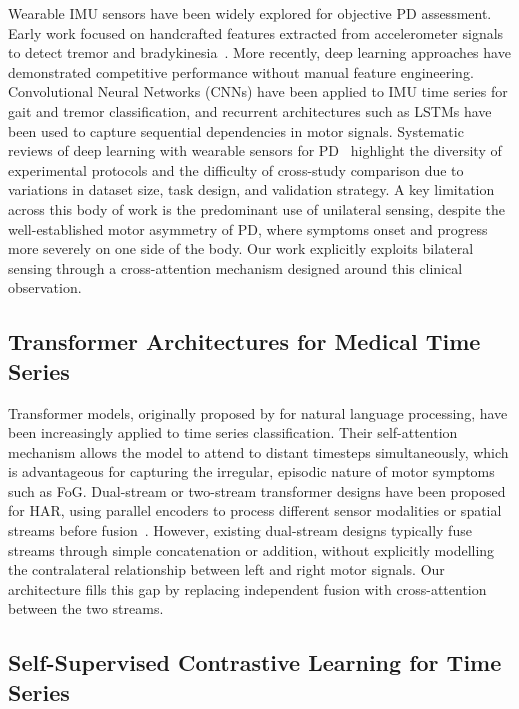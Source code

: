 \documentclass[pmlr]{jmlr}
\begin{document}
Wearable IMU sensors have been widely explored for objective PD
assessment. Early work focused on handcrafted features extracted from
accelerometer signals to detect tremor and bradykinesia~\citep{ref}.
More recently, deep learning approaches have demonstrated competitive
performance without manual feature engineering. Convolutional Neural
Networks (CNNs) have been applied to IMU time series for gait and
tremor classification, and recurrent architectures such as LSTMs have
been used to capture sequential dependencies in motor signals.
Systematic reviews of deep learning with wearable sensors for
PD~\citep{ref} highlight the diversity of experimental protocols and
the difficulty of cross-study comparison due to variations in dataset
size, task design, and validation strategy. A key limitation across
this body of work is the predominant use of unilateral sensing,
despite the well-established motor asymmetry of PD, where symptoms
onset and progress more severely on one side of the body. Our work
explicitly exploits bilateral sensing through a cross-attention
mechanism designed around this clinical observation.

\subsection{Transformer Architectures for Medical Time Series}

Transformer models, originally proposed by \citet{vaswani2017} for
natural language processing, have been increasingly applied to time
series classification. Their self-attention mechanism allows the model
to attend to distant timesteps simultaneously, which is advantageous
for capturing the irregular, episodic nature of motor symptoms such as
FoG. Dual-stream or two-stream transformer designs have been proposed
for HAR, using parallel encoders to process different sensor
modalities or spatial streams before fusion~\citep{ref}. However,
existing dual-stream designs typically fuse streams through simple
concatenation or addition, without explicitly modelling the
contralateral relationship between left and right motor signals. Our
architecture fills this gap by replacing independent fusion with
cross-attention between the two streams.

\subsection{Self-Supervised Contrastive Learning for Time Series}
\end{document}
